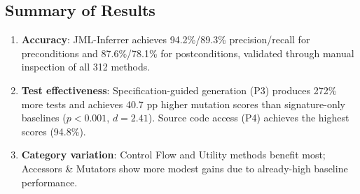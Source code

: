 \subsection{Summary of Results}

\begin{enumerate}
    \item \textbf{Accuracy}: JML-Inferrer achieves 94.2\%/89.3\% precision/recall for preconditions and 87.6\%/78.1\% for postconditions, validated through manual inspection of all 312 methods.

    \item \textbf{Test effectiveness}: Specification-guided generation (P3) produces 272\% more tests and achieves 40.7 pp higher mutation scores than signature-only baselines ($p < 0.001$, $d = 2.41$). Source code access (P4) achieves the highest scores (94.8\%).

    \item \textbf{Category variation}: Control Flow and Utility methods benefit most; Accessors \& Mutators show more modest gains due to already-high baseline performance.
\end{enumerate}
